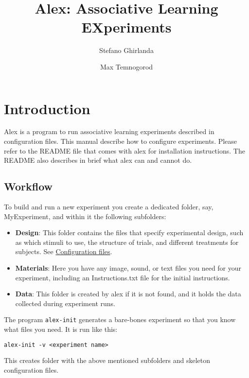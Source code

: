 \documentclass[11pt,]{article}
\title{Alex: Associative Learning EXperiments}
\author{Stefano Ghirlanda \and Max Temnogorod}
\date{}
\begin{document}
\maketitle

{
\hypersetup{linkcolor=black}
\setcounter{tocdepth}{3}
\begin{spacing}{0}
\small
\tableofcontents
\end{spacing}
\clearpage
}
\section{Introduction}

Alex is a program to run associative learning experiments described in
configuration files. This manual describe how to configure experiments.
Please refer to the README file that comes with alex for installation
instructions. The README also describes in brief what alex can and
cannot do.

\subsection{Workflow}

To build and run a new experiment you create a dedicated folder, say,
MyExperiment, and within it the following subfolders:

\begin{itemize}
\item
  \textbf{Design}: This folder contains the files that specify
  experimental design, such as which stimuli to use, the structure of
  trials, and different treatments for subjects. See
  \hyperref[configuration-files]{Configuration files}.
\item
  \textbf{Materials}: Here you have any image, sound, or text files you
  need for your experiment, including an Instructions.txt file for the
  initial instructions.
\item
  \textbf{Data}: This folder is created by alex if it is not found, and
  it holds the data collected during experiment runs.
\end{itemize}

The program \texttt{alex-init} generates a bare-bones experiment so that
you know what files you need. It is run like this:

\begin{verbatim}
alex-init -v <experiment name>
\end{verbatim}

This creates folder with the above mentioned subfolders and skeleton
configuration files.
\end{document}
